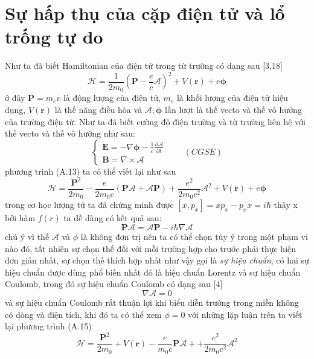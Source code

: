 \section{Sự hấp thụ của cặp điện tử và lổ trống tự do}
Như ta đã biết Hamiltonian của điện tử trong từ trường có dạng sau [3,18]
\begin{equation}
\mathcal{H}=\frac{1}{2m_0}\left(\mathbf{P} -\frac{e}{c}\mathcal{A}\right)^2 +V(\mathbf{r}) +e\boldsymbol{\phi}
\end{equation}
ở đây $\mathbf{P}=m_ev$ là động lượng của điện tử, $m_e$ là khối lượng của điện tử hiệu dụng, $V(\mathbf{r})$ là thế năng điều hòa và $\mathcal{A},\boldsymbol{\phi}$ lần lượt là thế vecto và thế vô hướng của trường điện từ. Như ta đã biết cường độ điện trường và từ trường liên hệ với thế vecto và thế vô hướng như sau:
\begin{equation}
 \begin{cases} \mathbf{E}=-\nabla\boldsymbol{\phi} -\frac{1}{c}\frac{\partial \mathcal{A}}{\partial t} \\
\mathbf{B} = \nabla\times\mathcal{A}
\end{cases}\qquad(CGSE)
\end{equation} 
phương trình (A.13) ta có thể viết lại như sau
\begin{equation}
\mathcal{H}=\frac{\mathbf{P}^2}{2m_0}-\frac{e}{2m_0 c}\left(\mathbf{P}\mathcal{A} + \mathcal{A}\mathbf{P}\right)+\frac{e^2}{2m_0 c^2}\mathcal{A}^2 +V(\mathbf{r}) +e\boldsymbol{\phi}
\end{equation}
trong cơ học lượng tử ta đã chứng minh được $[x,p_x]=xp_x -p_x x=i\hbar$ thây x bởi hàm $f(r)$ ta dễ dàng có kết quả sau:
\begin{equation}
\mathbf{P}\mathcal{A} = \mathcal{A}\mathbf{P} -i\hbar\nabla\mathcal{A}
\end{equation}
chú ý vì thế $\mathcal{A}$ và $\phi$ là không đơn trị nên ta có thể chọn tùy ý trong một phạm vi nào đó, tất nhiên sự chọn thế đối với mỗi trường hợp cho trước phải thực hiện đơn giản nhất, sự chọn thế thích hợp nhất như vậy gọi là \emph{sự hiệu chuẩn}, có hai sự hiệu chuẩn được dùng phổ biến nhất đó là hiệu chuẩn Lorentz và sự hiệu chuẩn Coulomb, trong đó sự hiệu chuẩn Coulomb có dạng sau [4]
\begin{equation}
\nabla\mathcal{A} = 0
\end{equation} 
và sự hiệu chuẩn Coulomb rất thuận lợi khi biểu diễn trường trong miền không có dòng và điện tích, khi đó ta có thể xem $\phi =0$ với những lặp luận trên ta viết lại phương trình (A.15)
\begin{equation}
\mathcal{H}=\frac{\mathbf{P}^2}{2m_0}+ V(\mathbf{r})-\frac{e}{m_0 c}\mathbf{P}\mathcal{A} + +\frac{e^2}{2m_0 c^2}\mathcal{A}^2
\end{equation}
